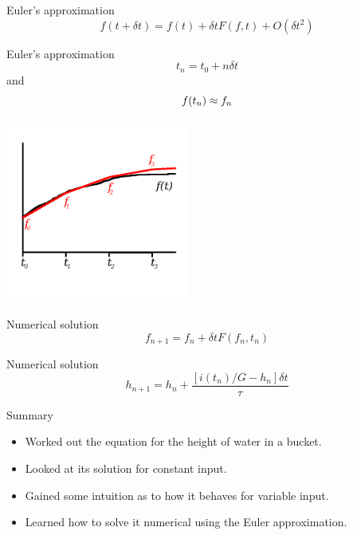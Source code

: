 \documentclass{beamer}
\newcommand{\crish}{\color{reddish}}
\newcommand{\cbla}{\color{black}}
\newcommand{\cred}{\color{red}}
\begin{document}
\begin{frame}{Euler's approximation}
  \crish
  $$
  f(t+\delta t)= f(t)+\delta t F(f,t)+O(\delta t^2)
  $$
\cbla
\end{frame}



\begin{frame}{Euler's approximation}
\crish
  $$
t_n=t_0+n\delta t
$$
\cbla
and\crish
$$f(t_n)\approx \cred{}f_n$$
\cbla
  \begin{center}
    \includegraphics[width=6cm]{f.png}
  \end{center}
\end{frame}

\begin{frame}{Numerical solution}
\crish
$$f_{n+1}=f_n+\delta t F(f_n,t_n)$$
\cbla
  \end{frame}


\begin{frame}{Numerical solution}
\crish
$$
h_{n+1}=h_n+\frac{[i(t_n)/G-h_n]\delta t}{\tau}
$$
\cbla
\end{frame}

\begin{frame}{Summary}
  \begin{itemize}
  \item Worked out the equation for the height of water in a bucket.
  \item Looked at its solution for constant input.
  \item Gained some intuition as to how it behaves for variable input.
  \item Learned how to solve it numerical using the Euler approximation.
  \end{itemize}
\end{frame}
\end{document}
